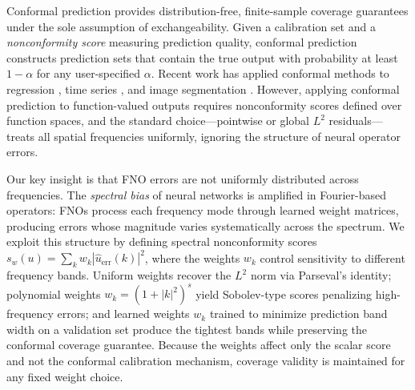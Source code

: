 Conformal prediction \citep{vovk2005algorithmic,shafer2008tutorial} provides
distribution-free, finite-sample coverage guarantees under the sole assumption
of exchangeability. Given a calibration set and a \emph{nonconformity score}
measuring prediction quality, conformal prediction constructs prediction sets
that contain the true output with probability at least $1 - \alpha$ for any
user-specified $\alpha$. Recent work has applied conformal methods to regression
\citep{romano2019conformalized}, time series \citep{stankeviciute2021conformal},
and image segmentation \citep{angelopoulos2022image}. However, applying
conformal prediction to function-valued outputs requires nonconformity scores
defined over function spaces, and the standard choice---pointwise or global
$L^2$ residuals---treats all spatial frequencies uniformly, ignoring the
structure of neural operator errors.

Our key insight is that FNO errors are not uniformly distributed across
frequencies. The \emph{spectral bias} of neural networks
\citep{rahaman2019spectral} is amplified in Fourier-based operators: FNOs
process each frequency mode through learned weight matrices, producing errors
whose magnitude varies systematically across the spectrum. We exploit this
structure by defining spectral nonconformity scores
$s_w(u) = \sum_k w_k |\hat{u}_{\mathrm{err}}(k)|^2$, where the weights $w_k$
control sensitivity to different frequency bands. Uniform weights recover the
$L^2$ norm via Parseval's identity; polynomial weights
$w_k = (1 + |k|^2)^s$ yield Sobolev-type scores penalizing high-frequency
errors; and learned weights $w_k$ trained to minimize prediction band width on a
validation set produce the tightest bands while preserving the conformal coverage
guarantee. Because the weights affect only the scalar score and not the conformal
calibration mechanism, coverage validity is maintained for any fixed weight
choice.

